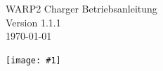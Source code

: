 \documentclass[a4paper,10pt]{article}
\title{}
\author{}
\newcommand{\gfx}[1]{\texttt{[image: \#1]}}
\begin{document}
\pagestyle{empty}
\begin{titlepage}
	\vspace*{-3.08cm}
	\colorbox{boxgray}{}
	\vfill
	\begin{center}
		\Huge
		WARP2 Charger Betriebsanleitung\\\vspace{1cm}
		\large
		Version 1.1.1\\\vspace{0.25cm}
		\today
	\end{center}
	\vfill \gfx{./img_warp2/resized/warp_perspective_blue_ready}
\end{titlepage}
\newpage
\null
\newpage
\pagestyle{fancy}
\end{document}
